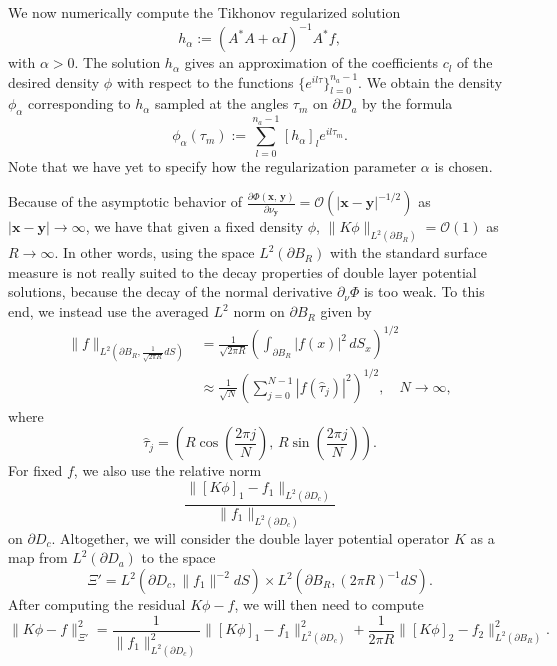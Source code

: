 \documentclass[11pt]{amsart}
\theoremstyle{definition}
\theoremstyle{definition}
\theoremstyle{definition}
\newcommand{\paren}[1]{\left ( #1\right )}
\begin{document}
We now numerically compute the Tikhonov regularized solution
\begin{equation*}
h_{\alpha} := (A^{*}A + \alpha I)^{-1}A^{*}f,
\end{equation*}
with $\alpha > 0$. The solution $h_{\alpha}$ gives an approximation of the coefficients $c_{l}$ of the desired density $\phi$ with respect to the functions $\{e^{il\tau}\}_{l=0}^{n_{a}-1}$. We obtain the density $\phi_{\alpha}$ corresponding to $h_{\alpha}$ sampled at the angles $\tau_{m}$ on $\partial D_{a}$ by the formula
\begin{equation*}
\phi_{\alpha}(\tau_{m}) := \sum_{l=0}^{n_{a}-1}[h_{\alpha}]_{l}e^{il\tau_{m}}.
\end{equation*}
Note that we have yet to specify how the regularization parameter $\alpha$ is chosen.

Because of the asymptotic behavior of $\frac{\partial \Phi(\mathbf{x},\, \mathbf{y})}{\partial \nu_{\mathbf{y}}} = \mathcal{O}(|\mathbf{x}-\mathbf{y}|^{-1/2})$ as $|\mathbf{x}-\mathbf{y}| \to \infty$, we have that given a fixed density $\phi$, $\|K\phi\|_{L^{2}(\partial B_{R})} = \mathcal{O}(1)$ as $R \to \infty$. In other words, using the space $L^{2}(\partial B_{R})$ with the standard surface measure is not really suited to the decay properties of double layer potential solutions, because the decay of the normal derivative $\partial_{\nu}\Phi$ is too weak. To this end, we instead use the averaged $L^{2}$ norm on $\partial B_{R}$ given by
\begin{align*}
\|f\|_{L^{2}(\partial B_{R}, \frac{1}{\sqrt{2\pi R}}dS)} & = \frac{1}{\sqrt{2\pi R}} \left( \int_{\partial B_{R}}|f(x)|^{2}\, dS_{x} \right)^{1/2}\\
& \approx \frac{1}{\sqrt{N}}\left(\sum_{j=0}^{N-1}|f(\widehat{\tau}_{j})|^{2} \right)^{1/2}, \quad N \to \infty,
\end{align*}
where
\begin{equation*}
\widehat{\tau}_{j} = \paren{R\cos\left( \frac{2\pi j}{N} \right), \, R\sin\left( \frac{2\pi j}{N} \right)}.
\end{equation*}
For fixed $f$, we also use the relative norm
\begin{equation}
\label{eq:F1}
\frac{\|[K\phi]_{1} - f_{1}\|_{L^{2}(\partial D_{c})}}{\|f_{1}\|_{L^{2}(\partial D_{c})}}
\end{equation}
on $\partial D_{c}$. Altogether, we will consider the double layer potential operator $K$ as a map from $L^{2}(\partial D_{a})$ to the space
\begin{equation}
\Xi' = L^{2}(\partial D_{c}, \|f_{1}\|^{-2}dS) \times L^{2}(\partial B_{R}, (2\pi R)^{-1}dS).
\end{equation}
After computing the residual $K\phi - f$, we will then need to compute
\begin{equation*}
\|K\phi - f\|_{\Xi'}^{2} = \frac{1}{\|f_{1}\|_{L^{2}(\partial D_{c})}^{2}}\| [K\phi]_{1}  - f_{1}\|_{L^{2}(\partial D_{c})}^{2} + \frac{1}{2\pi R} \|[K\phi]_{2} - f_{2}\|_{L^{2}(\partial B_{R})}^{2}.
\end{equation*}
\end{document}
